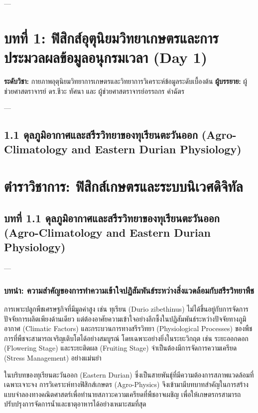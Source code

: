 \documentclass[11pt,a4paper,openany]{report}
\begin{document}
---



\chapter{บทที่ 1: ฟิสิกส์อุตุนิยมวิทยาเกษตรและการประมวลผลข้อมูลอนุกรมเวลา (Day 1)}


\textbf{ระดับวิชา:} กายภาพอุตุนิยมวิทยาการเกษตรและวิทยาการวิเคราะห์ข้อมูลระดับเบื้องต้น
\textbf{ผู้บรรยาย:} ผู้ช่วยศาสตราจารย์ ดร.ชีวะ ทัศนา และ ผู้ช่วยศาสตราจารย์อรรถกร คำฉัตร

---

\section{1.1 ดุลภูมิอากาศและสรีรวิทยาของทุเรียนตะวันออก (Agro-Climatology and Eastern Durian Physiology)}


\chapter{ตำราวิชาการ: ฟิสิกส์เกษตรและระบบนิเวศดิจิทัล}

\section{บทที่ 1.1 ดุลภูมิอากาศและสรีรวิทยาของทุเรียนตะวันออก (Agro-Climatology and Eastern Durian Physiology)}


---

\subsection{บทนำ: ความสำคัญของการทำความเข้าใจปฏิสัมพันธ์ระหว่างสิ่งแวดล้อมกับสรีรวิทยาพืช}


การเพาะปลูกพืชเศรษฐกิจที่มีมูลค่าสูง เช่น ทุเรียน (Durio zibethinus) ไม่ได้ขึ้นอยู่กับการจัดการปัจจัยการผลิตเพียงด้านเดียว แต่ต้องอาศัยความเข้าใจอย่างลึกซึ้งในปฏิสัมพันธ์ระหว่างปัจจัยทางภูมิอากาศ (Climatic Factors) และกระบวนการทางสรีรวิทยา (Physiological Processes) ของพืช การที่พืชจะสามารถเจริญเติบโตได้อย่างสมบูรณ์ โดยเฉพาะอย่างยิ่งในระยะวิกฤต เช่น ระยะออกดอก (Flowering Stage) และระยะติดผล (Fruiting Stage) จำเป็นต้องมีการจัดการความเครียด (Stress Management) อย่างแม่นยำ

ในบริบทของทุเรียนตะวันออก (Eastern Durian) ซึ่งเป็นสายพันธุ์ที่มีความต้องการสภาพแวดล้อมที่เฉพาะเจาะจง การวิเคราะห์ทางฟิสิกส์เกษตร (Agro-Physics) จึงเข้ามามีบทบาทสำคัญในการสร้างแบบจำลองทางคณิตศาสตร์เพื่อทำนายสภาวะความเครียดที่พืชอาจเผชิญ เพื่อให้เกษตรกรสามารถปรับปรุงการจัดการน้ำและธาตุอาหารได้อย่างเหมาะสมที่สุด
\end{document}
